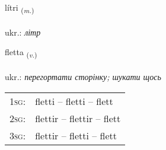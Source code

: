 \documentclass[frontgrid, backgrid]{flacards}\usepackage[]{graphicx}\usepackage[]{xcolor}
\begin{document}
\renewcommand{\blhead}{\vskip5pt {\small\bfseries\footnotesize Nafnorð | іменник }}
\renewcommand{\bcfoot}{\vskip5pt \hspace{2pt}{\small\bfseries\footnotesize 3K}}


{lítri \small{\textsubscript{(\textit{m.})}} \\[1ex] %
\textphonetic{[liːtrɪ]} \\
ukr.: \emph{літр} \\  [2ex]
\renewcommand*{\arraystretch}{0.8}
}

\renewcommand{\flhead}{\vskip5pt \fboxsep=0pt {\small\bfseries\footnotesize Sagnorð | дієслово}}
\renewcommand{\fcfoot}{\vskip5pt \fboxsep=0pt \hspace{2pt}{\small\bfseries\footnotesize 3K}}

\renewcommand{\blhead}{\vskip5pt {\small\bfseries\footnotesize Sagnorð | дієслово }}
\renewcommand{\bcfoot}{\vskip5pt \hspace{2pt}{\small\bfseries\footnotesize 3K}}


{fletta \small{\textsubscript{(\textit{v.})}} \\[1ex] %
\textphonetic{[flɛhta]} \\
ukr.: \emph{перегортати сторінку; шукати щось} \\  [2ex]
\renewcommand*{\arraystretch}{0.8}
\begin{tabular}{p{1cm}l}
\textsc{1sg}: & fletti -- fletti -- flett \\ 
\textsc{2sg}: & flettir -- flettir -- flett \\ 
\textsc{3sg}: & flettir -- fletti -- flett \\ 
\end{tabular}
}
\end{document}
